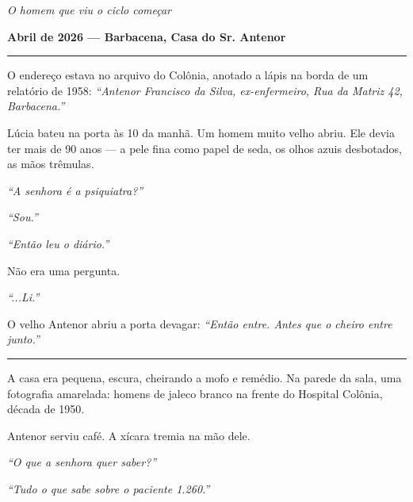 
\noindent \textit{O homem que viu o ciclo começar}

\noindent \textbf{Abril de 2026 --- Barbacena, Casa do Sr. Antenor}

\vspace{0.5em}\noindent\rule{\textwidth}{0.5pt}\vspace{0.5em}

\noindent O endereço estava no arquivo do Colônia, anotado a lápis na borda de um relatório de 1958: \textit{\textquotedblleft{}Antenor Francisco da Silva, ex-enfermeiro, Rua da Matriz 42, Barbacena.\textquotedblright{}}

\noindent Lúcia bateu na porta às 10 da manhã. Um homem muito velho abriu. Ele devia ter mais de 90 anos --- a pele fina como papel de seda, os olhos azuis desbotados, as mãos trêmulas.

\noindent \textit{\textquotedblleft{}A senhora é a psiquiatra?\textquotedblright{}}

\noindent \textit{\textquotedblleft{}Sou.\textquotedblright{}}

\noindent \textit{\textquotedblleft{}Então leu o diário.\textquotedblright{}}

\noindent Não era uma pergunta.

\noindent \textit{\textquotedblleft{}...Li.\textquotedblright{}}

\noindent O velho Antenor abriu a porta devagar: \textit{\textquotedblleft{}Então entre. Antes que o cheiro entre junto.\textquotedblright{}}

\vspace{0.5em}\noindent\rule{\textwidth}{0.5pt}\vspace{0.5em}

\noindent A casa era pequena, escura, cheirando a mofo e remédio. Na parede da sala, uma fotografia amarelada: homens de jaleco branco na frente do Hospital Colônia, década de 1950.

\noindent Antenor serviu café. A xícara tremia na mão dele.

\noindent \textit{\textquotedblleft{}O que a senhora quer saber?\textquotedblright{}}

\noindent \textit{\textquotedblleft{}Tudo o que sabe sobre o paciente 1.260.\textquotedblright{}}

